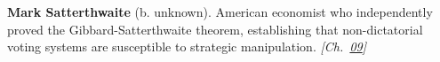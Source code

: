 \textbf{Mark Satterthwaite} (b. unknown). American economist who independently proved the Gibbard-Satterthwaite theorem, establishing that non-dictatorial voting systems are susceptible to strategic manipulation. \emph{[Ch.~\hyperref[ch:arrowtheoremtopology]{09}]}

